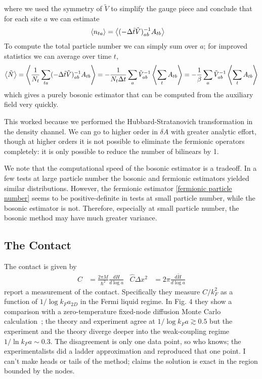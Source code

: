 where we used the symmetry of $\tilde{V}$ to simplify the gauge piece and conclude that for each site $a$ we can estimate
\begin{align}
	\left\langle n_{ta} \right\rangle &= \left\langle (-\Delta\tilde{t}\tilde{V})_{ab}^{-1} A_{tb} \right\rangle
\end{align}
To compute the total particle number we can simply sum over $a$; for improved statistics we can average over time $t$,
\begin{align}
	\left\langle \tilde{N} \right\rangle
	= \left\langle \frac{1}{N_t}\sum_{ta}(-\Delta\tilde{t}\tilde{V})_{ab}^{-1} A_{tb} \right\rangle
	= - \frac{1}{N_t \Delta t} \sum_a \tilde{V}_{ab}^{-1} \left\langle  \sum_t A_{tb} \right\rangle
	= - \frac{1}{\beta} \sum_a \tilde{V}_{ab}^{-1} \left\langle  \sum_t A_{tb} \right\rangle
	\label{eq:bosonic particle number}
\end{align}
which gives a purely bosonic estimator that can be computed from the auxiliary field very quickly.

This worked because we performed the Hubbard-Stratanovich transformation in the density channel.
We can go to higher order in $\delta A$ with greater analytic effort, though at higher orders it is not possible to eliminate the fermionic operators completely: it is only possible to reduce the number of bilinears by 1.

We note that the computational speed of the bosonic estimator is a tradeoff.
In a few tests at large particle number the bosonic and fermionic estimators yielded similar distributions.
However, the fermionic estimator \eqref{fermionic particle number} seems to be positive-definite in tests at small particle number, while the bosonic estimator is not.
Therefore, especially at small particle number, the bosonic method may have much greater variance.

\subsection{The Contact}\label{sec:contact}

The contact is given by~\cite{PhysRevA.86.013626}
\begin{align}
	\hat{C} &= \frac{2 \pi M}{\hbar^2} \frac{dH}{d\log a}
	&
	\hat{C}\Delta x^2 &= 2\pi \frac{d\tilde{H}}{d\log a} 
	\label{eq:contact}
\end{align}
 report a measurement of the contact.
Specifically they measure $C/k_F^2$ as a function of $1/\log k_F a_{2D}$ in the Fermi liquid regime.
In  Fig. 4 they show a comparison with a zero-temperature fixed-node diffusion Monte Carlo calculation~\cite{PhysRevLett.106.110403}; the theory and experiment agree at $1/\log k_F a \gtrsim 0.5$ but the experiment and the theory diverge deeper into the weak-coupling regime $1/\ln k_F a \sim 0.3$.
The disagreement is only one data point, so who knows; the experimentalists did a ladder approximation and reproduced that one point.
I can't make heads or tails of the method;  claims the solution is exact in the region bounded by the nodes.

